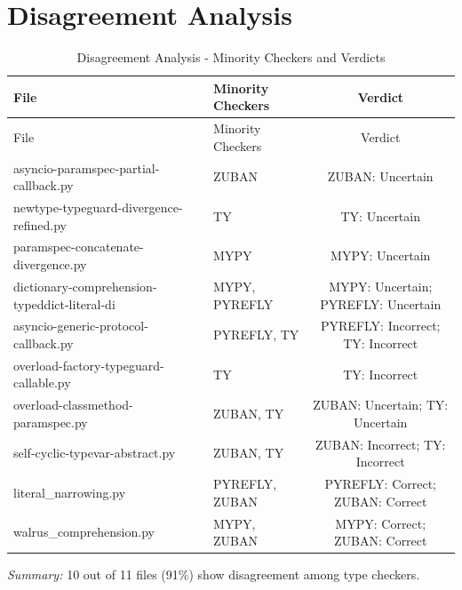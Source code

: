 \documentclass{article}
\begin{document}
\section{Disagreement Analysis}
\begin{longtable}{p{5cm}lc}
\caption{Disagreement Analysis - Minority Checkers and Verdicts}\label{tab:disagreements}\\
\toprule
File & Minority Checkers & Verdict \\
\midrule
\endfirsthead
\toprule
File & Minority Checkers & Verdict \\
\midrule
\endhead
\bottomrule
\endlastfoot
asyncio-paramspec-partial-callback.py & ZUBAN & ZUBAN: Uncertain \\
newtype-typeguard-divergence-refined.py & TY & TY: Uncertain \\
paramspec-concatenate-divergence.py & MYPY & MYPY: Uncertain \\
dictionary-comprehension-typeddict-literal-di & MYPY, PYREFLY & MYPY: Uncertain; PYREFLY: Uncertain \\
asyncio-generic-protocol-callback.py & PYREFLY, TY & PYREFLY: Incorrect; TY: Incorrect \\
overload-factory-typeguard-callable.py & TY & TY: Incorrect \\
overload-classmethod-paramspec.py & ZUBAN, TY & ZUBAN: Uncertain; TY: Uncertain \\
self-cyclic-typevar-abstract.py & ZUBAN, TY & ZUBAN: Incorrect; TY: Incorrect \\
literal\_narrowing.py & PYREFLY, ZUBAN & PYREFLY: Correct; ZUBAN: Correct \\
walrus\_comprehension.py & MYPY, ZUBAN & MYPY: Correct; ZUBAN: Correct \\
\bottomrule
\end{longtable}

\textit{Summary:} 10 out of 11 files (91\%) show disagreement among type checkers.
\end{document}
